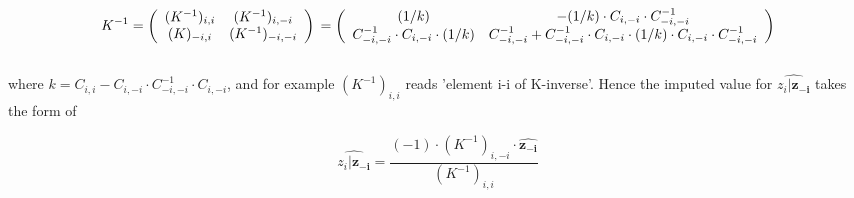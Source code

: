 \documentclass{article}
\newcommand{\tensor}[1]{#1}
\begin{document}
\begin{equation*}
   K^{-1}=\left( \begin{array}{cc} (\tensor{K}^{-1})_{i,i} &  (\tensor{K}^{-1})_{i,-i}\\
     (\tensor{K})_{-i,i} &(\tensor{K}^{-1})_{-i,-i} \end{array} \right)\\
   
   = \left( \begin{array}{cc} (1/k) &
    -(1/k) \cdot \tensor{C}_{i,-i}\cdot \tensor{C}^{-1}_{-i,-i}\\
    \tensor{C}^{-1}_{-i,-i} \cdot \tensor{C}_{i,-i} \cdot (1/k) &
    \tensor{C}^{-1}_{-i,-i} + \tensor{C}^{-1}_{-i,-i}\cdot \tensor{C}_{i,-i} \cdot (1/k) \cdot \tensor{C}_{i,-i} \cdot \tensor{C}^{-1}_{-i,-i} \end{array} \right)
\end{equation*}
\\

where $k= \tensor{C}_{i,i}-\tensor{C}_{i,-i} \cdot \tensor{C}^{-1}_{-i,-i} \cdot \tensor{C}_{i,-i}$, and for example $(\tensor{K}^{-1})_{i,i}$ reads 'element i-i of K-inverse'. Hence the imputed value for $\widehat{z_i|\bm{z_{-i}}}$ takes the form of

\begin{equation*}
  \widehat{z_i|\bm{z_{-i}}} = \frac{(-1) \cdot (\tensor{K}^{-1})_{i,-i} \cdot \widehat{\bm{z_{-i}}}}{(\tensor{K}^{-1})_{i,i}}
\end{equation*}





\end{document}
